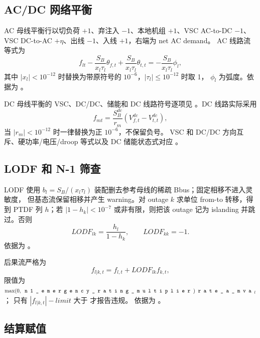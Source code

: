 \subsection{AC/DC 网络平衡}

AC 母线平衡行以切负荷 $+1$、弃注入 $-1$、本地机组 $+1$、VSC AC-to-DC $-1$、
VSC DC-to-AC $+\eta$、出线 $-1$、入线 $+1$，右端为 net AC demand。
AC 线路流等式为
\begin{equation}
 f_{lt}-\frac{S_B}{x_l\tau_l}\theta_{f,t}
 +\frac{S_B}{x_l\tau_l}\theta_{t,t}
 =-\frac{S_B}{x_l\tau_l}\phi_l,
\end{equation}
其中 $|x_l|<10^{-12}$ 时替换为带原符号的 $10^{-6}$，$|\tau_l|\le10^{-12}$ 时取 1，
$\phi_l$ 为弧度。依据为 。

DC 母线平衡的 VSC、DC/DC、储能和 DC 线路符号逐项见
。DC 线路实际采用
\begin{equation}
 f_{mt}=\frac{S_B^{dc}}{r_m}(V_{f,t}^{dc}-V_{t,t}^{dc}),
\end{equation}
当 $|r_m|<10^{-12}$ 时一律替换为正 $10^{-6}$，不保留负号。
VSC 和 DC/DC 方向互斥、硬功率/电压/droop 等式以及 DC 储能状态式对应
。

\subsection{LODF 和 N-1 筛查}

LODF 使用 $b_l=S_B/(x_l\tau_l)$ 装配删去参考母线的稀疏 Bbus；固定相移不进入灵敏度，
但基态流保留相移并产生 warning。对 outage $k$ 求单位 from-to 转移，得到 PTDF 列 $h$；若
$|1-h_k|<10^{-7}$ 或非有限，则把该 outage 记为 islanding 并跳过。否则
\begin{equation}
 LODF_{lk}=\frac{h_l}{1-h_k},\qquad LODF_{kk}=-1.
\end{equation}
依据为 。

后果流严格为
\begin{equation}
 f_{l|k,t}=f_{l,t}+LODF_{lk}f_{k,t},
\end{equation}
限值为 $\max(0,\fld{n1\_emergency\_rating\_multiplier})\fld{rate\_a\_mva}_l$；
只有 $|f_{l|k,t}|-limit$ 大于  才报告违规。
依据为 。

\subsection{结算赋值}

